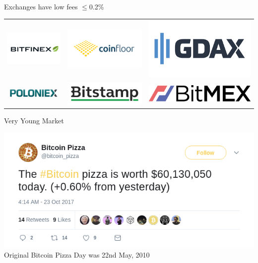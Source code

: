 \documentclass{beamer}
\begin{document}
\begin{frame}{Exchanges have low fees $\leq$0.2\%}
  \begin{tabular}{c c c}
        \includegraphics[width=0.3\linewidth]{images/bitfinex} & \includegraphics[width=0.3\linewidth]{images/coinfloor} & \includegraphics[width=0.3\linewidth]{images/gdax}\\
        \includegraphics[width=0.3\linewidth]{images/poloniex} & \includegraphics[width=0.3\linewidth]{images/bitstamp} & \includegraphics[width=0.3\linewidth]{images/bitmex}
      \end{tabular}
\end{frame}


\begin{frame}{Very Young Market}
  \begin{center}
    \includegraphics[width=0.8\linewidth]{images/pizza_tweet}\\
    Original Bitcoin Pizza Day was 22nd May, 2010 \cite{BitPizza}
  \end{center}
\end{frame}
\end{document}
